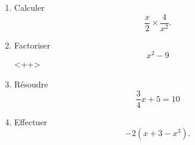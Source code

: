 
\begin{exercice}\label{exoPremiere-0022}

    \begin{enumerate}
        \item
            Calculer
            \begin{equation}
                \frac{ x }{ 2 }\times\frac{ 4 }{ x^2 }.
            \end{equation}
        \item
            Factoriser
            \begin{equation}
                x^2-9
            \end{equation}
            <++>
        \item
            Résoudre
            \begin{equation}
                \frac{ 3 }{ 4 }x+5=10
            \end{equation}
        \item
            Effectuer
            \begin{equation}
                -2(x+3-x^3).
            \end{equation}
    \end{enumerate}

\end{exercice}
